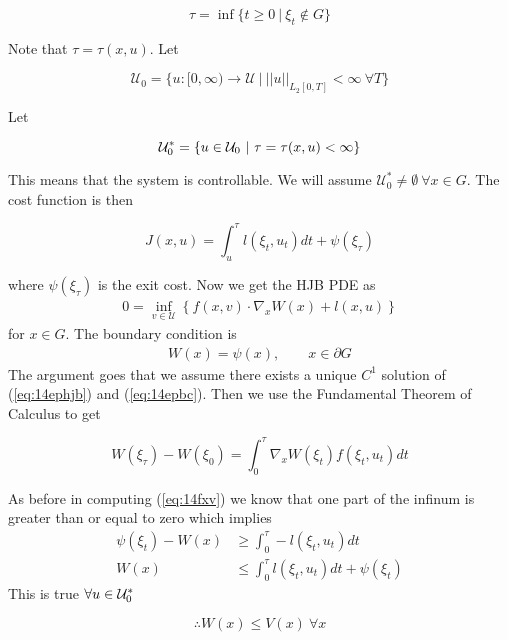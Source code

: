 \begin{equation*}
\tau = \inf\{t\geq 0~|~\xi_t\notin G\}
\end{equation*}

Note that $\tau=\tau(x,u)$.
Let

\begin{equation*}
\mathcal{U}_0 = \{u:[0,\infty)\to\mathcal{U}~|~||u||_{L_2[0,T]}<\infty~\forall T\}%
\end{equation*}

Let

\begin{equation*}
\mathcal{U}_0^\ast = \{u\in\mathcal{U}_0~|~\tau=\tau(x,u)<\infty\}
\end{equation*}

This means that the system is controllable.
We will assume $\mathcal{U}_0^\ast\neq\emptyset~\forall x\in G$.
The cost function is then

\begin{equation*}
J(x,u) = \int_u^\tau l(\xi_t,u_t)dt + \psi(\xi_\tau)
\end{equation*}

where $\psi(\xi_\tau)$ is the exit cost.
Now we get the HJB PDE as
\begin{align}
\label{eq:14ephjb}
0 = \inf_{v\in\mathcal{U}} \left\lbrace f(x,v)\cdot\nabla_x W(x) + l(x,u) \right\rbrace
\end{align}
for $x\in G$.
The boundary condition is
\begin{align}
\label{eq:14epbc}
W(x) = \psi(x), \qquad x\in\partial G
\end{align}
The argument goes that we assume there exists a unique $C^1$ solution of (\ref{eq:14ephjb}) and (\ref{eq:14epbc}).
Then we use the Fundamental Theorem of Calculus to get

\begin{equation*}
W(\xi_\tau) - W(\xi_0) = \int_0^\tau \nabla_x W(\xi_t)f(\xi_t,u_t)dt
\end{equation*}

As before in computing (\ref{eq:14fxv}) we know that one part of the infinum is greater than or equal to zero which implies
\begin{align*}
\psi(\xi_t) - W(x) &\geq \int_0^\tau -l(\xi_t,u_t)dt \\
W(x) &\leq \int_0^\tau l(\xi_t,u_t)dt + \psi(\xi_t)
\end{align*}
This is true $\forall u\in\mathcal{U}_0^\ast$

\begin{equation*}
\therefore W(x)\leq V(x)~\forall x
\end{equation*}

